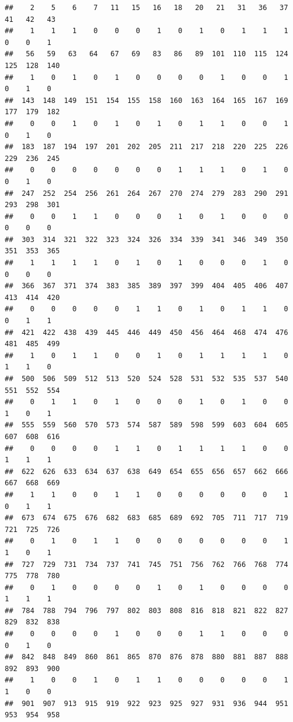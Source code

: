 \documentclass[
]{article}
\begin{document}
\begin{verbatim}
##    2    5    6    7   11   15   16   18   20   21   31   36   37   41   42   43 
##    1    1    1    0    0    0    1    0    1    0    1    1    1    0    0    1 
##   56   59   63   64   67   69   83   86   89  101  110  115  124  125  128  140 
##    1    0    1    0    1    0    0    0    0    1    0    0    1    0    1    0 
##  143  148  149  151  154  155  158  160  163  164  165  167  169  177  179  182 
##    0    0    1    0    1    0    1    0    1    1    0    0    1    0    1    0 
##  183  187  194  197  201  202  205  211  217  218  220  225  226  229  236  245 
##    0    0    0    0    0    0    0    1    1    1    0    1    0    0    1    0 
##  247  252  254  256  261  264  267  270  274  279  283  290  291  293  298  301 
##    0    0    1    1    0    0    0    1    0    1    0    0    0    0    0    0 
##  303  314  321  322  323  324  326  334  339  341  346  349  350  351  353  365 
##    1    1    1    1    0    1    0    1    0    0    0    1    0    0    0    0 
##  366  367  371  374  383  385  389  397  399  404  405  406  407  413  414  420 
##    0    0    0    0    0    1    1    0    1    0    1    1    0    0    1    1 
##  421  422  438  439  445  446  449  450  456  464  468  474  476  481  485  499 
##    1    0    1    1    0    0    1    0    1    1    1    1    0    1    1    0 
##  500  506  509  512  513  520  524  528  531  532  535  537  540  551  552  554 
##    0    1    1    0    1    0    0    0    1    0    1    0    0    1    0    1 
##  555  559  560  570  573  574  587  589  598  599  603  604  605  607  608  616 
##    0    0    0    0    1    1    0    1    1    1    1    0    0    1    1    1 
##  622  626  633  634  637  638  649  654  655  656  657  662  666  667  668  669 
##    1    1    0    0    1    1    0    0    0    0    0    0    1    0    1    1 
##  673  674  675  676  682  683  685  689  692  705  711  717  719  721  725  726 
##    0    1    0    1    1    0    0    0    0    0    0    0    1    1    0    1 
##  727  729  731  734  737  741  745  751  756  762  766  768  774  775  778  780 
##    0    1    0    0    0    0    1    0    1    0    0    0    0    1    1    1 
##  784  788  794  796  797  802  803  808  816  818  821  822  827  829  832  838 
##    0    0    0    0    1    0    0    0    1    1    0    0    0    0    1    0 
##  842  848  849  860  861  865  870  876  878  880  881  887  888  892  893  900 
##    1    0    0    1    0    1    1    0    0    0    0    0    1    1    0    0 
##  901  907  913  915  919  922  923  925  927  931  936  944  951  953  954  958 

\end{verbatim}
\end{document}
